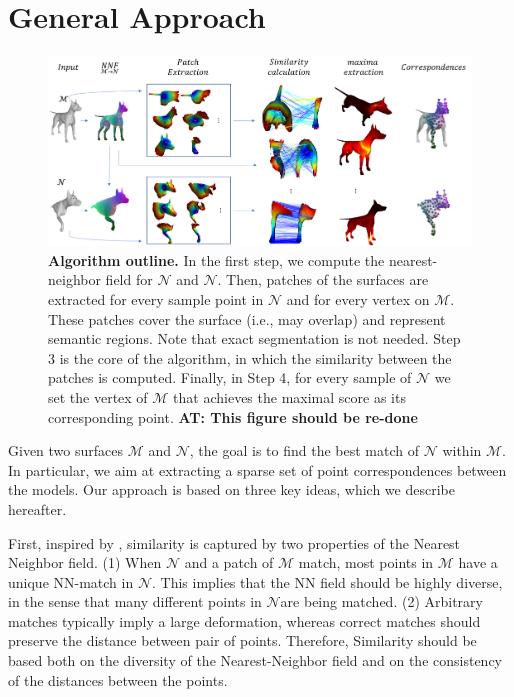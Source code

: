 \documentclass[10pt,twocolumn,letterpaper]{article}
\newcommand{\colornote}[3]{{\color{#1}\bf{#2: #3}\normalfont}}
\newcommand{\colornote}[3]{}
\newcommand {\ayellet}[1]{\colornote{blue}{AT}{#1}}
\begin{document}
\section{General Approach}
\label{sec:approach}
\begin{figure}[htb]
	\centering
	\includegraphics[width=1\textwidth]{figures/Birds_Flight.png}
	\caption{{\bf Algorithm outline.}
    In the first step, we compute the nearest-neighbor field for $\mathcal{N}$ and $\mathcal{N}$.
    Then, patches of the surfaces are extracted for every sample point in $\mathcal{N}$ and for every vertex on $\mathcal{M}$.
    These patches cover the surface (i.e., may overlap) and represent semantic regions. 
    Note that exact segmentation is not needed.
    Step 3 is the core of the algorithm, in which the similarity between the patches is computed.
    Finally, in Step 4, for every sample of $\mathcal{N}$ we set the vertex of $\mathcal{M}$ that achieves the maximal score as its corresponding point.
	\ayellet{This figure should be re-done} 
	}
	\label{fig:overview}
\end{figure}

Given two surfaces $\mathcal{M}$ and $\mathcal{N}$, the goal is to find the best match of  $\mathcal{N}$ within  $\mathcal{M}$.
In particular, we aim at extracting a sparse set of point correspondences between the models. 
Our approach is based on three key ideas, which we describe hereafter.

First, inspired by \cite{talmi2017template}, similarity is captured by two properties of the Nearest Neighbor field. 
(1) When $\mathcal{N}$ and a patch of $\mathcal{M}$ match, most points in $\mathcal{M}$ have a unique NN-match in $\mathcal{N}$. 
This implies that the NN field should be highly diverse, in the sense that many different points in $\mathcal{N}$are being matched.
(2) Arbitrary matches typically imply a large deformation, whereas correct matches should preserve the distance between pair of points.
Therefore, Similarity should be based both on the diversity of the Nearest-Neighbor field and on the consistency of the distances between the points.
\end{document}
